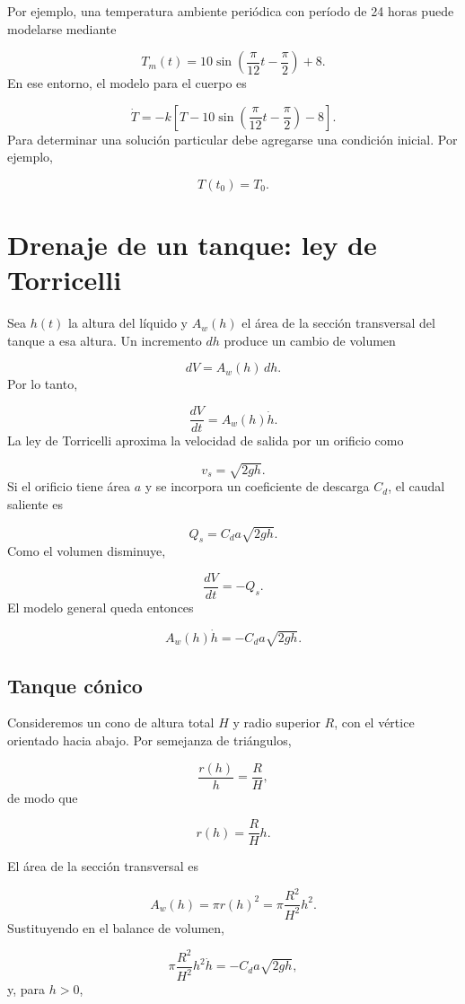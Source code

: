 \documentclass[12pt,a4paper]{article}
\begin{document}
	Por ejemplo, una temperatura ambiente periódica con período de 24 horas puede modelarse mediante

	\[
	T_m(t)
	=
	10\sin\left(\frac{\pi}{12}t-\frac{\pi}{2}\right)+8.
	\]
	En ese entorno, el modelo para el cuerpo es

	\[
	\boxed{
	\dot T
	=
	-k\left[
	T-10\sin\left(\frac{\pi}{12}t-\frac{\pi}{2}\right)-8
	\right].}
	\]
	Para determinar una solución particular debe agregarse una condición inicial. Por ejemplo,

	\[
	T(t_0)=T_0.
	\]

	\clearpage
	\section{Drenaje de un tanque: ley de Torricelli}

	Sea \(h(t)\) la altura del líquido y \(A_w(h)\) el área de la sección transversal del tanque a esa altura. Un incremento \(dh\) produce un cambio de volumen

	\[
	dV=A_w(h)\,dh.
	\]
	Por lo tanto,

	\[
	\frac{dV}{dt}=A_w(h)\dot h.
	\]
	La ley de Torricelli aproxima la velocidad de salida por un orificio como

	\[
	v_s=\sqrt{2gh}.
	\]
	Si el orificio tiene área \(a\) y se incorpora un coeficiente de descarga \(C_d\), el caudal saliente es

	\[
	Q_s=C_da\sqrt{2gh}.
	\]
	Como el volumen disminuye,

	\[
	\frac{dV}{dt}=-Q_s.
	\]
	El modelo general queda entonces

	\[
	\boxed{A_w(h)\dot h=-C_da\sqrt{2gh}.}
	\]

	\subsection{Tanque cónico}

	Consideremos un cono de altura total \(H\) y radio superior \(R\), con el vértice orientado hacia abajo. Por semejanza de triángulos,

	\[
	\frac{r(h)}{h}=\frac{R}{H},
	\]
	de modo que

	\[
	r(h)=\frac{R}{H}h.
	\]

	El área de la sección transversal es

	\[
	A_w(h)
	=
	\pi r(h)^2
	=
	\pi\frac{R^2}{H^2}h^2.
	\]
	Sustituyendo en el balance de volumen,

	\[
	\pi\frac{R^2}{H^2}h^2\dot h
	=
	-C_da\sqrt{2gh},
	\]
	y, para \(h>0\),
\end{document}
